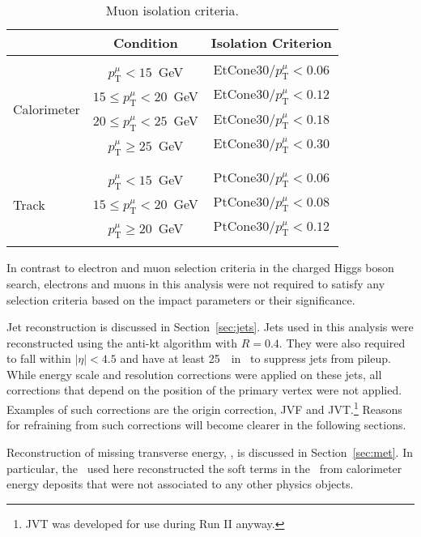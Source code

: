 \begin{table}[!h]
\begin{center}
\begin{tabular}{|l|cc|}
\hline
           								& Condition                & Isolation Criterion   \\
\hline\hline
					& &  \\
\multirow{4}{*}{Calorimeter}  & $p^{\mu}_{\mathrm{T}} < 15$~GeV &  $\mathrm{EtCone30} / p^{\mu}_{\mathrm{T}} < 0.06$ \\
													    & $15 \le p^{\mu}_{\mathrm{T}} < 20$~GeV & $\mathrm{EtCone30} / p^{\mu}_{\mathrm{T}} < 0.12$ \\
															& $20 \le p^{\mu}_{\mathrm{T}} < 25$~GeV & $\mathrm{EtCone30} / p^{\mu}_{\mathrm{T}} < 0.18$ \\
												      & $p^{\mu}_{\mathrm{T}} \ge 25$~GeV & $\mathrm{EtCone30} / p^{\mu}_{\mathrm{T}} < 0.30$ \\
					& &  \\
\hline
					& &  \\
\multirow{3}{*}{Track}  & $p^{\mu}_{\mathrm{T}} < 15$~GeV &  $\mathrm{PtCone30} / p^{\mu}_{\mathrm{T}} < 0.06$ \\
												& $15 \le p^{\mu}_{\mathrm{T}} < 20$~GeV & $\mathrm{PtCone30} / p^{\mu}_{\mathrm{T}} < 0.08$ \\
                        & $p^{\mu}_{\mathrm{T}} \ge 20$~GeV & $\mathrm{PtCone30} / p^{\mu}_{\mathrm{T}} < 0.12$ \\
					& &  \\
\hline
\end{tabular}
\end{center}
\caption{Muon isolation criteria.}
\label{tab:muIso}
\end{table}

\par In contrast to electron and muon selection criteria in the charged Higgs boson search, electrons 
and muons in this analysis were not required to satisfy any selection criteria based on the 
impact parameters or their significance. 

\par Jet reconstruction is discussed in Section~\ref{sec:jets}. 
Jets used in this analysis were reconstructed using the anti-kt 
algorithm with $R=0.4$. They were also required to fall within $|\eta|<4.5$ and have at least 
25~\GeV\ in \pt\ to suppress jets from pileup. While energy scale and resolution corrections 
were applied on these jets, all corrections that depend on the position of the primary vertex 
were not applied. Examples of such corrections are the origin correction, JVF and JVT.\footnote{JVT was 
developed for use during Run II anyway.} Reasons for refraining from such corrections will become 
clearer in the following sections.     

\par Reconstruction of missing transverse energy, \met, is discussed in 
Section~\ref{sec:met}. In particular, the \met\ used here reconstructed the soft 
terms in the \met\ from calorimeter energy deposits that were not 
associated to any other physics objects. 
 
